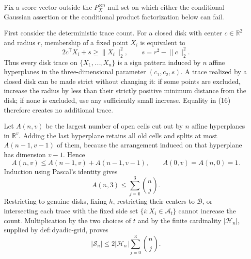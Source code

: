 Fix a score vector outside the \(P_X^{\otimes n}\)-null set on which either the conditional Gaussian assertion or the conditional product factorization below can fail.

First consider the deterministic trace count. For a closed disk with center \(c\in\mathbb R^2\) and radius \(r\), membership of a fixed point \(X_i\) is equivalent to
\[
 2c^{\mathsf T}X_i+s\ge \lVert X_i\rVert_2^2,
 \qquad s=r^2-\lVert c\rVert_2^2. \tag{16}
\]
Thus every disk trace on \(\{X_1,\ldots,X_n\}\) is a sign pattern induced by \(n\) affine hyperplanes in the three-dimensional parameter \((c_1,c_2,s)\). A trace realized by a closed disk can be made strict without changing it: if some points are excluded, increase the radius by less than their strictly positive minimum distance from the disk; if none is excluded, use any sufficiently small increase. Equality in (16) therefore creates no additional trace.

Let \(A(n,v)\) be the largest number of open cells cut out by \(n\) affine hyperplanes in \(\mathbb R^v\). Adding the last hyperplane retains all old cells and splits at most \(A(n-1,v-1)\) of them, because the arrangement induced on that hyperplane has dimension \(v-1\). Hence
\[
 A(n,v)\le A(n-1,v)+A(n-1,v-1),
 \qquad A(0,v)=A(n,0)=1. \tag{17}
\]
Induction using Pascal's identity gives
\[
 A(n,3)\le\sum_{j=0}^3\binom nj. \tag{18}
\]
Restricting to genuine disks, fixing \(h\), restricting their centers to \(\mathcal B\), or intersecting each trace with the fixed side set \(\{i:X_i\in\mathcal A_t\}\) cannot increase the count. Multiplication by the two choices of \(t\) and by the finite cardinality \(|\mathcal H_n|\), supplied by \(\mathrm{def:dyadic\text{-}grid}\), proves
\[
 |\mathscr S_n|\le2|\mathcal H_n|\sum_{j=0}^3\binom nj. \tag{19}
\]

